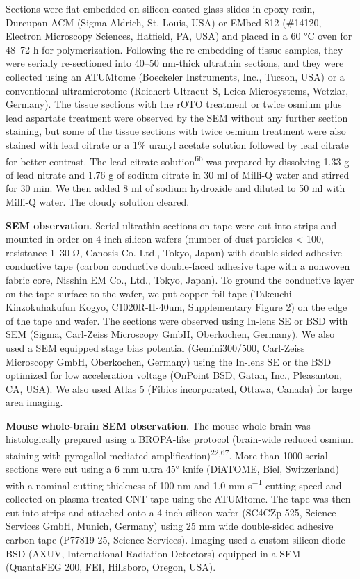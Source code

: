 \documentclass{article}
\begin{document}
Sections were flat-embedded on silicon-coated glass slides in epoxy resin, Durcupan ACM (Sigma-Aldrich, St. Louis, USA) or EMbed-812 (\#14120, Electron Microscopy Sciences, Hatfield, PA, USA) and placed in a 60 °C oven for 48–72 h for polymerization. Following the re-embedding of tissue samples, they were serially re-sectioned into 40–50 nm-thick ultrathin sections, and they were collected using an ATUMtome (Boeckeler Instruments, Inc., Tucson, USA) or a conventional ultramicrotome (Reichert Ultracut S, Leica Microsystems, Wetzlar, Germany). The tissue sections with the rOTO treatment or twice osmium plus lead aspartate treatment were observed by the SEM without any further section staining, but some of the tissue sections with twice osmium treatment were also stained with lead citrate or a 1\% uranyl acetate solution followed by lead citrate for better contrast. The lead citrate solution\textsuperscript{66} was prepared by dissolving 1.33 g of lead nitrate and 1.76 g of sodium citrate in 30 ml of Milli-Q water and stirred for 30 min. We then added 8 ml of sodium hydroxide and diluted to 50 ml with Milli-Q water. The cloudy solution cleared.

\textbf{SEM observation}. Serial ultrathin sections on tape were cut into strips and mounted in order on 4-inch silicon wafers (number of dust particles < 100, resistance 1–30 Ω, Canosis Co. Ltd., Tokyo, Japan) with double-sided adhesive conductive tape (carbon conductive double-faced adhesive tape with a nonwoven fabric core, Nisshin EM Co., Ltd., Tokyo, Japan). To ground the conductive layer on the tape surface to the wafer, we put copper foil tape (Takeuchi Kinzokuhakufun Kogyo, C1020R-H-40um, Supplementary Figure 2) on the edge of the tape and wafer. The sections were observed using In-lens SE or BSD with SEM (Sigma, Carl-Zeiss Microscopy GmbH, Oberkochen, Germany). We also used a SEM equipped stage bias potential (Gemini300/500, Carl-Zeiss Microscopy GmbH, Oberkochen, Germany) using the In-lens SE or the BSD optimized for low acceleration voltage (OnPoint BSD, Gatan, Inc., Pleasanton, CA, USA). We also used Atlas 5 (Fibics incorporated, Ottawa, Canada) for large area imaging.

\textbf{Mouse whole-brain SEM observation}. The mouse whole-brain was histologically prepared using a BROPA-like protocol (brain-wide reduced osmium staining with pyrogallol-mediated amplification)\textsuperscript{22,67}. More than 1000 serial sections were cut using a 6 mm ultra 45° knife (DiATOME, Biel, Switzerland) with a nominal cutting thickness of 100 nm and 1.0 mm s\textsuperscript{−1} cutting speed and collected on plasma-treated CNT tape using the ATUMtome. The tape was then cut into strips and attached onto a 4-inch silicon wafer (SC4CZp-525, Science Services GmbH, Munich, Germany) using 25 mm wide double-sided adhesive carbon tape (P77819-25, Science Services). Imaging used a custom silicon-diode BSD (AXUV, International Radiation Detectors) equipped in a SEM (QuantaFEG 200, FEI, Hillsboro, Oregon, USA).
\end{document}
